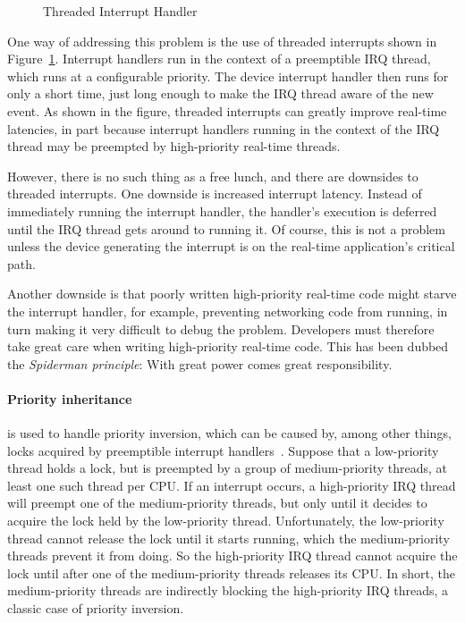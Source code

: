 \begin{figure}[tb]
\centering
{}
\caption{Threaded Interrupt Handler}
\label{fig:rt:Threaded Interrupt Handler}
\end{figure}

One way of addressing this problem is the use of threaded interrupts shown in
Figure~\ref{fig:rt:Threaded Interrupt Handler}.
Interrupt handlers run in the context of a preemptible IRQ thread,
which runs at a configurable priority.
The device interrupt handler then runs for only a short time, just
long enough to make the IRQ thread aware of the new event.
As shown in the figure, threaded interrupts can greatly improve
real-time latencies, in part because interrupt handlers running in
the context of the IRQ thread may be preempted by high-priority real-time
threads.

However, there is no such thing as a free lunch, and there are downsides
to threaded interrupts.
One downside is increased interrupt latency.
Instead of immediately running the interrupt handler, the handler's execution
is deferred until the IRQ thread gets around to running it.
Of course, this is not a problem unless the device generating the interrupt
is on the real-time application's critical path.

Another downside is that poorly written high-priority real-time code
might starve the interrupt handler, for example, preventing networking
code from running, in turn making it very difficult to debug the problem.
Developers must therefore take great care when writing high-priority
real-time code.
This has been dubbed the \emph{Spiderman principle}: With great power
comes great responsibility.

\paragraph{Priority inheritance} is used to handle priority inversion,
which can be caused by, among other things, locks acquired by
preemptible interrupt handlers~\cite{LuiSha1990PriorityInheritance}.
Suppose that a low-priority thread holds a lock, but is preempted by
a group of medium-priority threads, at least one such thread per CPU.
If an interrupt occurs, a high-priority IRQ thread will preempt one
of the medium-priority threads, but only until it decides to acquire
the lock held by the low-priority thread.
Unfortunately, the low-priority thread cannot release the lock until
it starts running, which the medium-priority threads prevent it from
doing.
So the high-priority IRQ thread cannot acquire the lock until after one
of the medium-priority threads releases its CPU.
In short, the medium-priority threads are indirectly blocking the
high-priority IRQ threads, a classic case of priority inversion.

